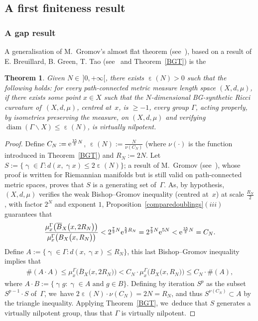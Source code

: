 \documentclass[pdftex]{sigma}
\numberwithin{equation}{section}
\newtheorem{theor}{Theorem}[section]
\newcommand{\diam}{\operatorname{diam}}
\newcommand{\g}{\operatorname{\gamma}}
\newcommand{\e}{\operatorname{\varepsilon}}
\begin{document}
\subsection{A first finiteness result}

\subsubsection{A gap result}
A generalisation of M.~Gromov's almost flat theorem (see~\cite{BK}), based on a result of E. Breuillard, B. Green, T. Tao (see~\cite[Corollary~11.2]{BGT} and Theorem~\ref{BGT}) is the

\begin{theor}%
Given $N \in \, ]0, +\infty [$, there exists $ \e(N) > 0$ such that the following holds: for every path-connected metric measure length space $(X,d, \mu)$, if there exists
some point $x \in X$ such that the $N$-dimensional BG-synthetic Ricci curvature of~$(X,d, \mu)$, centred at~$x$, is $\ge - 1$, every group $\Gamma$,
acting properly, by isometries preserving the measure, on $(X,d, \mu)$ and verifying $\diam (\Gamma \backslash X) \le \e(N)$, is virtually nilpotent.
\end{theor}

\begin{proof}
Define $C_N := {\rm e}^{\frac{15}{2} N} $, $\e(N) := \frac{N}{\nu (C_N)}$
(where $\nu (\cdot)$ is the function introduced in Theorem~\ref{BGT})
and $R_N := 2 N$.
Let $ S := \{\g \in \Gamma\colon d(x, \g x) \le 2 \e (N) \}$; a result of M.~Gromov
(see~\cite[Proposition~3.22]{Gr1}), whose proof is written for Riemannian manifolds but is still valid on path-connected metric spaces, proves that $S$ is a generating set of~$\Gamma$.
As, by hypothesis, $(X,d, \mu)$ verifies the weak Bishop--Gromov inequality (centred at~$x$) at scale $\frac{R_N}{2}$, with factor $2^N$ and exponent
$1$, Proposition~\ref{comparedoublings}$(iii)$ guarantees that
\begin{gather*}
\dfrac{\mu^\Gamma_x \big(\overline B_X \big(x, 2 R_N\big)\big)}{\mu^\Gamma_x \big(B_X \big(x, R_N\big)\big)} < 2^{\frac{7}{2} N} {\rm e}^{\frac{5}{2}R_N} = 2^{\frac{7}{2} N} {\rm e}^{5 N} < {\rm e}^{\frac{15}{2} N} = C_N.
\end{gather*}
Define $A := \{\g \in \Gamma\colon d(x, \g x) \le R_N\}$, this last Bishop--Gromov inequality implies that
\begin{gather*}
\# (A\cdot A) \le \mu^\Gamma_x \big( \overline B_X \big( x, 2 R_N\big)\big) < C_N \cdot \mu^\Gamma_x \big(B_X \big(x, R_N\big)\big) \le C_N \cdot \# (A),
\end{gather*}
where $A\cdot B := \{\g g \colon \g \in A \text{ and } g \in B\}$. Defining
by iteration $S^p$ as the subset $S^{p-1}\cdot S$ of~$\Gamma$, we~have
$2 \e(N) \cdot \nu (C_N) = 2 N = R_N$, and thus $S^{\nu (C_N)} \subset A$ by the triangle inequality.
Applying Theorem~\ref{BGT}, we~deduce that $S$ generates a virtually nilpotent group, thus that $\Gamma$ is virtually nilpotent.
\end{proof}
\end{document}
